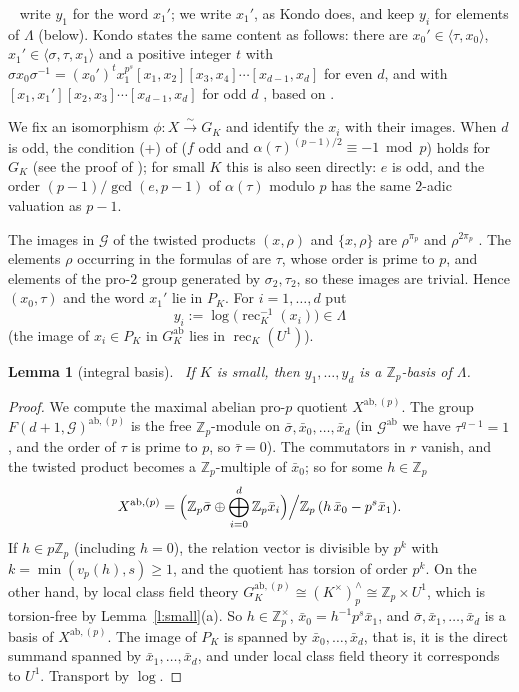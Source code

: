 \documentclass[11pt,a4paper]{article}
\newcommand{\Zp}{\mathbb{Z}_p}
\newcommand{\cG}{\mathcal{G}}
\newcommand{\rec}{\operatorname{rec}}
\newcommand{\xb}{\bar x}
\newcommand{\lab}[2]{{\upshape\fcolorbox{#1}{#1!8}{\scriptsize\sffamily\bfseries\textcolor{#1}{#2}}}}
\newcommand{\tagS}{\lab{blue}{S}}
\newcommand{\tagP}{\lab{ForestGreen}{P}}
\theoremstyle{plain}
\newtheorem{lemma}[theorem]{Lemma}
\theoremstyle{definition}
\theoremstyle{remark}
\begin{document}
\tagS\ \cite{JW} write $y_1$ for the word $x_1'$; we write $x_1'$, as Kondo does, and keep $y_i$ for elements of
$\Lambda$ (below). Kondo states the same content as follows: there are $x_0'\in\langle\tau,x_0\rangle$,
$x_1'\in\langle\sigma,\tau,x_1\rangle$ and a positive integer $t$ with
$\sigma x_0\sigma^{-1}=(x_0')^tx_1^{p^s}[x_1,x_2][x_3,x_4]\cdots[x_{d-1},x_d]$ for even $d$, and with
$[x_1,x_1'][x_2,x_3]\cdots[x_{d-1},x_d]$ for odd $d$ \cite[Thm.~1.1]{Kondo}, based on \cite[Thm.~7.5.14]{NSW}.

We fix an isomorphism $\phi\colon X\xrightarrow{\sim}G_K$ and identify the $x_i$ with their images. When $d$ is odd,
the condition (+) of \cite[1.2]{JW} ($f$ odd and $\alpha(\tau)^{(p-1)/2}\equiv-1\bmod p$) holds for $G_K$ (see the
proof of \cite[Thm.~2]{JW}); for small $K$ this is also seen directly: $e$ is odd, and the order
$(p-1)/\gcd(e,p-1)$ of $\alpha(\tau)$ modulo $p$ has the same $2$-adic valuation as $p-1$.

The images in $\cG$ of the twisted products $(x,\rho)$ and $\{x,\rho\}$ are $\rho^{\pi_p}$ and $\rho^{2\pi_p}$
\cite[p.~74]{JW}. The elements $\rho$ occurring in the formulas of \cite{JW} are $\tau$, whose order is prime to $p$,
and elements of the pro-$2$ group generated by $\sigma_2,\tau_2$, so these images are trivial. Hence $(x_0,\tau)$ and
the word $x_1'$ lie in $P_K$. For $i=1,\dots,d$ put
\[
y_i:=\log\bigl(\rec_K^{-1}(x_i)\bigr)\in\Lambda
\]
(the image of $x_i\in P_K$ in $G_K^{\mathrm{ab}}$ lies in $\rec_K(U^1)$).

\begin{lemma}[integral basis]\label{l:basis}
\tagP\ If $K$ is small, then $y_1,\dots,y_d$ is a $\Zp$-basis of $\Lambda$.
\end{lemma}
\begin{proof}
We compute the maximal abelian pro-$p$ quotient $X^{\mathrm{ab},(p)}$. The group $F(d+1,\cG)^{\mathrm{ab},(p)}$ is the
free $\Zp$-module on $\bar\sigma,\xb_0,\dots,\xb_d$ (in $\cG^{\mathrm{ab}}$ we have $\tau^{q-1}=1$, and the order of
$\tau$ is prime to $p$, so $\bar\tau=0$). The commutators in $r$ vanish, and the twisted product becomes a
$\Zp$-multiple of $\xb_0$; so for some $h\in\Zp$
\[
X^{\mathrm{ab},(p)}=\Bigl(\Zp\bar\sigma\oplus\bigoplus_{i=0}^{d}\Zp\xb_i\Bigr)\Big/\Zp\,(h\,\xb_0-p^s\xb_1).
\]
If $h\in p\Zp$ (including $h=0$), the relation vector is divisible by $p^k$ with $k=\min(v_p(h),s)\ge1$, and the
quotient has torsion of order $p^k$. On the other hand, by local class field theory
$G_K^{\mathrm{ab},(p)}\cong(K^{\times})^{\wedge}_p\cong\Zp\times U^1$, which is torsion-free by
Lemma~\ref{l:small}(a). So $h\in\Zp^{\times}$, $\xb_0=h^{-1}p^s\xb_1$, and $\bar\sigma,\xb_1,\dots,\xb_d$ is a basis
of $X^{\mathrm{ab},(p)}$. The image of $P_K$ is spanned by $\xb_0,\dots,\xb_d$, that is, it is the direct summand
spanned by $\xb_1,\dots,\xb_d$, and under local class field theory it corresponds to $U^1$. Transport by $\log$.
\end{proof}
\end{document}
